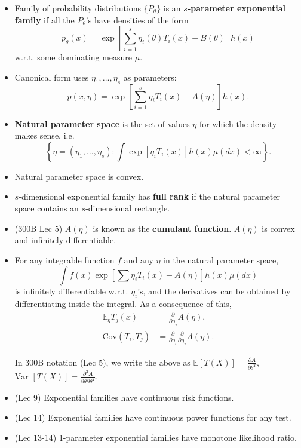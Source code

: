 \documentclass[twoside]{article}
\newcommand{\dis}{\displaystyle}
\newcommand\bbE{\mathbb{E}}
\def\t{\theta}
\newcommand\var{\text{Var }}
\begin{document}
\begin{itemize}
\item Family of probability distributions $\{P_\t \}$ is an \textbf{$s$-parameter exponential family} if all the $P_\t$'s have densities of the form 
\begin{equation*}
p_\t(x) = \exp \left[ \sum_{i=1}^s \eta_i(\t)T_i (x) - B(\t) \right] h(x)
\end{equation*}
w.r.t. some dominating measure $\mu$.

\item Canonical form uses $\eta_1, \dots, \eta_s$ as parameters:
\begin{equation*}
p(x, \eta) = \exp \left[ \sum_{i=1}^s \eta_i T_i (x) - A(\eta) \right] h(x).
\end{equation*}

\item \textbf{Natural parameter space} is the set of values $\eta$ for which the density makes sense, i.e.
\begin{equation*}
\left\{ \eta = (\eta_1, \dots, \eta_s): \int \exp \left[ \eta_i T_i(x) \right]h(x) \mu(dx) < \infty \right\}.
\end{equation*}

\item Natural parameter space is convex.

\item $s$-dimensional exponential family has \textbf{full rank} if the natural parameter space contains an $s$-dimensional rectangle.

\item (300B Lec 5) $A(\eta)$ is known as the \textbf{cumulant function}. $A(\eta)$ is convex and infinitely differentiable.

\item For any integrable function $f$ and any $\eta$ in the natural parameter space,
\begin{equation*}
\int f(x) \exp \left[ \sum \eta_i T_i(x) - A(\eta) \right] h(x) \mu(dx)
\end{equation*}
is infinitely differentiable w.r.t. $\eta_i$'s, and the derivatives can be obtained by differentiating inside the integral. As a consequence of this,
\begin{align*}
\bbE_\eta T_j (x) &= \frac{\partial}{\partial \eta_j} A(\eta), \\ 
\text{Cov}(T_i, T_j) &= \frac{\partial}{\partial \eta_i} \frac{\partial}{\partial \eta_j} A(\eta).
\end{align*}

In 300B notation (Lec 5), we write the above as $\bbE[T(X)] = \dis\frac{\partial A}{\partial \t^T}$, $\var[T(X)] = \dis\frac{\partial^2 A}{\partial \t \partial \t^T}$.

\item (Lec 9) Exponential families have continuous risk functions.

\item (Lec 14) Exponential families have continuous power functions for any test.

\item (Lec 13-14) 1-parameter exponential families have monotone likelihood ratio.

\end{itemize}
\end{document}
